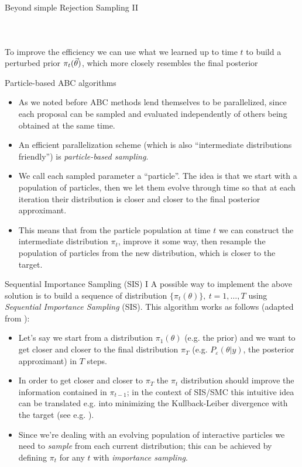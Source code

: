 \documentclass{beamer}
\theoremstyle{remark}
\newcommand{\nologo}{\setbeamertemplate{logo}{}} %
\begin{document}
{\begin{frame}{Beyond simple Rejection Sampling II}
\begin{columns}
\begin{figure}[H]
\end{figure}
\end{columns}
To improve the efficiency we can use what we learned up to time $t$ to build a perturbed prior $\pi_t(\va{\theta})$, which more closely resembles the final posterior
\end{frame}
}

\begin{frame}{Particle-based ABC algorithms}
\begin{itemize}[<+->]
    \item As we noted before ABC methods lend themselves to be parallelized, since each proposal can be sampled and evaluated independently of others being obtained at the same time.
    \item An efficient parallelization scheme (which is also ``intermediate distributions friendly'') is \emph{particle-based sampling}.
    \item We call each sampled parameter a ``particle''. The idea is that we start with a population of particles, then we let them evolve through time so that at each iteration their distribution is closer and closer to the final posterior approximant.
    \item This means that from the particle population at time $t$ we can construct the intermediate distribution $\pi_t$, improve it some way, then resample the population of particles from the new distribution, which is closer to the target.
\end{itemize}
\end{frame}

{\nologo
\begin{frame}{Sequential Importance Sampling (SIS) I}
A possible way to implement the above solution is to build a sequence of distribution $\{\pi_t(\theta)\},  \ t = 1,\dots, T$ using \emph{Sequential Importance Sampling} (SIS). This algorithm works as follows (adapted from \cite{abc_smc}):
\begin{itemize}[<+->]
    \item Let's say we start from a distribution $\pi_1(\theta)$ (e.g. the prior) and we want to get closer and closer to the final distribution $\pi_T$ (e.g. $P_\varepsilon(\theta|y)$, the posterior approximant) in $T$ steps.
    \item In order to get closer and closer to $\pi_T$ the $\pi_t$ distribution should improve the information contained in $\pi_{t-1}$; in the context of SIS/SMC this intuitive idea can be translated e.g. into minimizing the Kullback-Leiber divergence with the target (see e.g. \cite{astroABC}).
    \item Since we're dealing with an evolving population of interactive particles we need to \emph{sample} from each current distribution; this can be achieved by defining $\pi_t$ for any $t$ with \emph{importance sampling}.
\end{itemize}
\end{frame}
}
\end{document}
